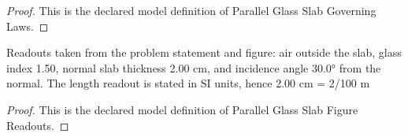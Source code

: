 \begin{proof}
  This is the declared model definition of Parallel Glass Slab Governing Laws.
\end{proof}
\begin{definition}
  \label{def:physics:phyx-mini-0003:phyxmini0003-parallelglassslabfigurereadouts}
  Readouts taken from the problem statement and figure: air outside the slab, glass index 1.50, normal slab thickness 2.00 cm, and incidence angle 30.0° from the normal. The length readout is stated in SI units, hence 2.00 cm = 2/100 m
\end{definition}
\begin{proof}
  This is the declared model definition of Parallel Glass Slab Figure Readouts.
\end{proof}
